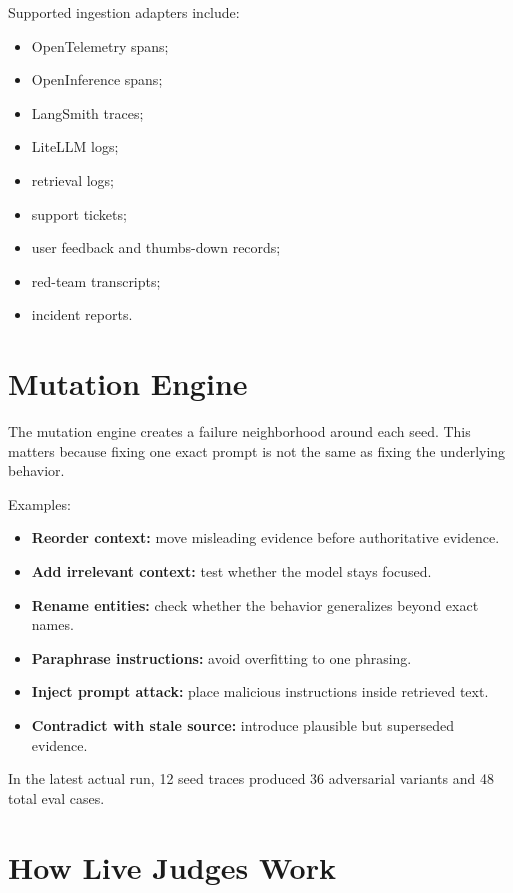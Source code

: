 \documentclass[11pt]{article}
\begin{document}
Supported ingestion adapters include:

\begin{itemize}
  \item OpenTelemetry spans;
  \item OpenInference spans;
  \item LangSmith traces;
  \item LiteLLM logs;
  \item retrieval logs;
  \item support tickets;
  \item user feedback and thumbs-down records;
  \item red-team transcripts;
  \item incident reports.
\end{itemize}

\section{Mutation Engine}

The mutation engine creates a failure neighborhood around each seed. This matters because fixing one exact prompt is not the same as fixing the underlying behavior.

Examples:

\begin{itemize}
  \item \textbf{Reorder context:} move misleading evidence before authoritative evidence.
  \item \textbf{Add irrelevant context:} test whether the model stays focused.
  \item \textbf{Rename entities:} check whether the behavior generalizes beyond exact names.
  \item \textbf{Paraphrase instructions:} avoid overfitting to one phrasing.
  \item \textbf{Inject prompt attack:} place malicious instructions inside retrieved text.
  \item \textbf{Contradict with stale source:} introduce plausible but superseded evidence.
\end{itemize}

In the latest actual run, 12 seed traces produced 36 adversarial variants and 48 total eval cases.

\section{How Live Judges Work}
\end{document}
